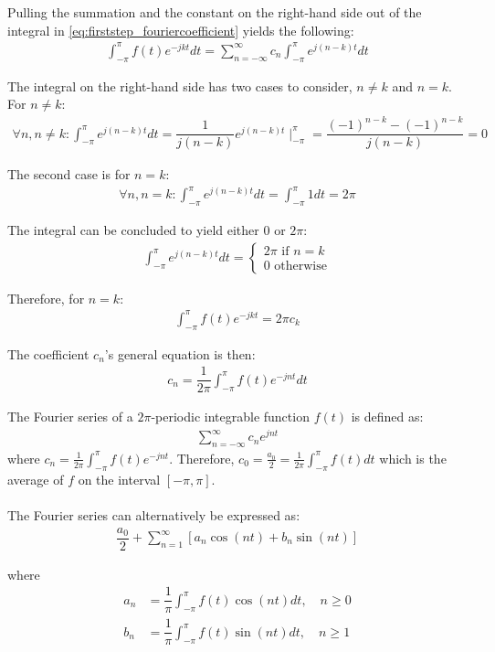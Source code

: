 Pulling the summation and the constant on the right-hand side out of the integral in \eqref{eq:firststep_fouriercoefficient} yields the following:
\begin{align*}
\int_{-\pi}^\pi f(t) e^{-j k t}dt = \sum_{n=-\infty}^\infty c_n \int_{-\pi}^\pi e^{j (n-k) t}dt
\end{align*}

The integral on the right-hand side has two cases to consider, $n \neq k$ and $n = k$. For $n\neq k$:
\begin{align*}
	\forall n,n\neq k: \int_{-\pi}^\pi e^{j(n-k)t}dt 
	=\dfrac{1}{j(n-k)}e^{j(n-k)t}\mid_{-\pi}^{\pi}
	=\dfrac{(-1)^{n-k}-(-1)^{n-k}}{j(n-k)}
	=0
\end{align*}

The second case is for $n = k$:
\begin{align*}
	\forall n,n=k: \int_{-\pi}^\pi e^{j(n-k)t}dt = \int_{-\pi}^\pi 1 dt = 2\pi
\end{align*}

The integral can be concluded to yield either $0$ or $2\pi$:
\begin{align}
	\int_{-\pi}^{\pi} e^{j (n-k)t}dt 
	= 
	\begin{cases}
			2\pi \text{ if } n=k\\
			0 \text{ otherwise}
	\end{cases}
\end{align}

Therefore, for $n = k$:
\begin{align*}
\int_{-\pi}^\pi f(t)e^{-j k t} = 2\pi c_k
\end{align*}

The coefficient $c_n$'s general equation is then:
\begin{align*}
	c_n = \dfrac{1}{2\pi} \int_{-\pi}^{\pi} f(t) e^{-j n t}dt
\end{align*}

\begin{definition} \label{def:fourier_definition}
The Fourier series of a $2\pi$-periodic integrable function $f(t)$ is defined as:
\begin{align*}
	\sum_{n=-\infty}^\infty c_n e^{j n t}
\end{align*}
where $c_n = \frac{1}{2\pi}\int_{- \pi}^\pi f(t) e^{-j n t}$. Therefore, $c_0 = \frac{a_0}{2} = \frac{1}{2\pi} \int_{-\pi}^\pi f(t) dt$ which is the average of $f$ on the interval $[-\pi,\pi]$.
\\ \\
The Fourier series can alternatively be expressed as:
\begin{align*}
	\dfrac{a_0}{2} + \sum_{n=1}^{\infty} \left[ a_n \cos(n t) + b_n \sin(n t)\right]
\end{align*}

where
\begin{align*}
	a_n 
	&= \dfrac{1}{\pi} \int_{-\pi}^\pi f(t) \cos (n t) dt, \quad 	n \geq 0\\
	b_n
	&= \dfrac{1}{\pi} \int_{-\pi}^\pi f(t) \sin (n t) dt, \quad 	n \geq 1
\end{align*}
\end{definition}

